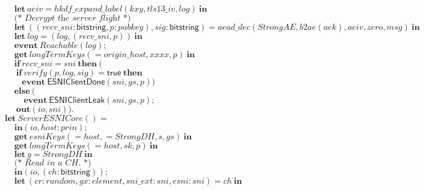 \documentclass{article}
\newcommand{\kwl}[1]{\mathbf{#1}}
\newcommand{\kwc}[1]{\mathsf{#1}}
\newcommand{\kwt}[1]{\mathsf{#1}}
\newcommand{\kwe}[1]{\mathsf{#1}}
\newcommand{\var}[1]{\mathit{#1}}
\theoremstyle{definition}
\begin{document}
\begin{tabbing}
$\ \ \ \ \ \kwl{let}\ \var{aeiv} = \var{hkdf{\_}expand{\_}label}(\var{kxy}, \var{tls13{\_}iv}, \var{log})\ \kwl{in} $\\
$ $\\
$\ \ \ \ \ \textit{(* Decrypt the server flight *)} $\\
$\ \ \ \ \ \kwl{let}\ ((\var{recv{\_}sni}{:}\kwt{bitstring}, \var{p}{:}\var{pubkey}), \var{sig}{:}\kwt{bitstring}) = \var{aead{\_}dec}(\var{StrongAE}, \var{b2ae}(\var{aek}), \var{aeiv}, \var{zero}, \var{msg})\ \kwl{in} $\\
$\ \ \ \ \ \kwl{let}\ \var{log} = (\var{log}, (\var{recv{\_}sni}, \var{p}))\ \kwl{in} $\\
$ $\\
$\ \ \ \ \ \kwl{event}\ \var{Reachable}(\var{log}); $\\
$ $\\
$\ \ \ \ \ \kwl{get}\ \var{longTermKeys}( = \var{origin{\_}host}, \var{xxxx}, \var{p})\ \kwl{in} $\\
$\ \ \ \ \ \kwl{if}\ \var{recv{\_}sni} = \var{sni}\ \kwl{then}\ ( $\\
$\ \ \ \ \ \ \kwl{if}\ \var{verify}(\var{p}, \var{log}, \var{sig}) = \kwc{true}\ \kwl{then} $\\
$\ \ \ \ \ \ \ \ \ \kwl{event}\ \kwe{ESNIClientDone}(\var{sni}, \var{gs}, \var{p})) $\\
$\ \ \ \ \ \kwl{else}\ ( $\\
$\ \ \ \ \ \ \ \ \ \ \kwl{event}\ \kwe{ESNIClientLeak}(\var{sni}, \var{gs}, \var{p}); $\\
$\ \ \ \ \ \ \kwl{out}(\var{io}, \var{sni})). $\\
$ $\\
$ $\\
$\kwl{let}\ \var{ServerESNICore}() =  $\\
$\ \ \ \ \ \kwl{in}(\var{io}, \var{host}{:}\var{prin}); $\\
$\ \ \ \ \ \kwl{get}\ \var{esniKeys}( = \var{host},  = \var{StrongDH}, \var{s}, \var{gs})\ \kwl{in} $\\
$\ \ \ \ \ \kwl{get}\ \var{longTermKeys}( = \var{host}, \var{sk}, \var{p})\ \kwl{in} $\\
$\ \ \ \ \ \kwl{let}\ \var{g} = \var{StrongDH}\ \kwl{in} $\\
$ $\\
$\ \ \ \ \ \textit{(* Read in a CH. *)} $\\
$\ \ \ \ \ \kwl{in}(\var{io}, (\var{ch}{:}\kwt{bitstring})); $\\
$\ \ \ \ \ \kwl{let}\ (\var{cr}{:}\var{random}, \var{gx}{:}\var{element}, \var{sni{\_}ext}{:}\var{sni}, \var{esni}{:}\var{sni}) = \var{ch}\ \kwl{in} $\\

\end{tabbing}
\end{document}
